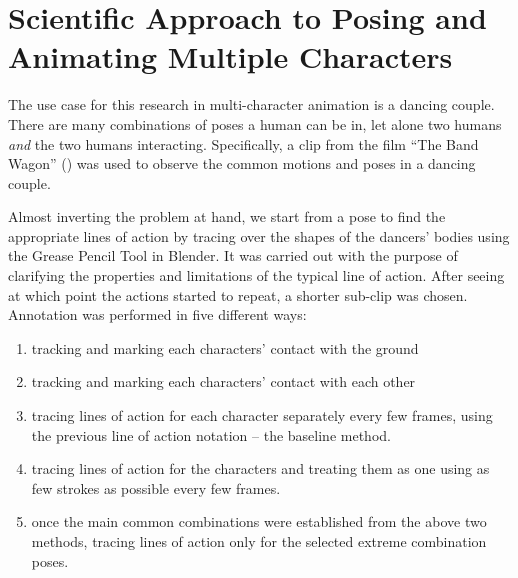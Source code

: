 \section{Scientific Approach to Posing and Animating Multiple Characters}

The use case for this research in multi-character animation is a dancing couple. There are many combinations of poses a human can be in, let alone two humans \textit{and} the two humans interacting. Specifically, a clip from the film ``The Band Wagon'' (\citep{thebandwagon1953}) was used to observe the common motions and poses in a dancing couple.

Almost inverting the problem at hand, we start from a pose to find the appropriate lines of action by tracing over the shapes of the dancers' bodies using the Grease Pencil Tool in Blender. It was carried out with the purpose of clarifying the properties and limitations of the typical line of action. After seeing at which point the actions started to repeat, a shorter sub-clip was chosen. Annotation was performed in five different ways:
\begin{enumerate}
	\item tracking and marking each characters' contact with the ground
	\item tracking and marking each characters' contact with each other
	\item tracing lines of action for each character separately every few frames, using the previous line of action notation -- the baseline method.
	\item tracing lines of action for the characters and treating them as one using as few strokes as possible every few frames.
	\item once the main common combinations were established from the above two methods, tracing lines of action only for the selected extreme combination poses.
\end{enumerate}

